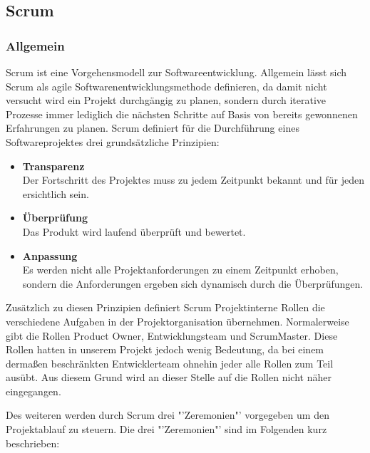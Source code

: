 \subsection{Scrum}
\subsubsection{Allgemein}
Scrum ist eine Vorgehensmodell zur Softwareentwicklung. Allgemein lässt sich Scrum als agile Softwarenentwicklungsmethode definieren, da damit nicht versucht wird ein Projekt durchgängig zu planen, sondern durch iterative Prozesse immer lediglich die nächsten Schritte auf Basis von bereits gewonnenen Erfahrungen zu planen.
Scrum definiert für die Durchführung eines Softwareprojektes drei grundsätzliche Prinzipien:

\begin{itemize}
\item \textbf{Transparenz}\\
Der Fortschritt des Projektes muss zu jedem Zeitpunkt bekannt und für jeden ersichtlich sein.
\item \textbf{Überprüfung}\\
Das Produkt wird laufend überprüft und bewertet.
\item \textbf{Anpassung}\\
Es werden nicht alle Projektanforderungen zu einem Zeitpunkt erhoben, sondern die Anforderungen ergeben sich dynamisch durch die Überprüfungen.
\end{itemize}

Zusätzlich zu diesen Prinzipien definiert Scrum Projektinterne Rollen die verschiedene Aufgaben in der Projektorganisation übernehmen. Normalerweise gibt die Rollen Product Owner, Entwicklungsteam und ScrumMaster. Diese Rollen hatten in unserem Projekt jedoch wenig Bedeutung, da bei einem dermaßen beschränkten Entwicklerteam ohnehin jeder alle Rollen zum Teil ausübt. Aus diesem Grund wird an dieser Stelle auf die Rollen nicht näher eingegangen.

Des weiteren werden durch Scrum drei "'Zeremonien"' vorgegeben um den Projektablauf zu steuern. Die drei "'Zeremonien"' sind im Folgenden kurz beschrieben:

